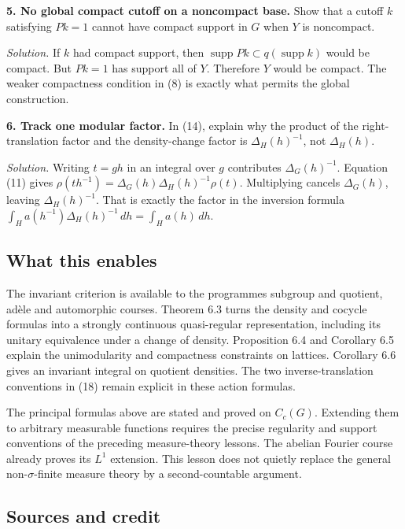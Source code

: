 \documentclass[
  english,
  11pt,
  a4paper,
]{article}
\begin{document}
\textbf{5. No global compact cutoff on a noncompact base.} Show that a
cutoff \(k\) satisfying \(Pk=1\) cannot have compact support in \(G\)
when \(Y\) is noncompact.

\emph{Solution.} If \(k\) had compact support, then
\(\operatorname{supp}Pk\subset q(\operatorname{supp}k)\) would be
compact. But \(Pk=1\) has support all of \(Y\). Therefore \(Y\) would be
compact. The weaker compactness condition in (8) is exactly what permits
the global construction.

\textbf{6. Track one modular factor.} In (14), explain why the product
of the right-translation factor and the density-change factor is
\(\Delta_H(h)^{-1}\), not \(\Delta_H(h)\).

\emph{Solution.} Writing \(t=gh\) in an integral over \(g\) contributes
\(\Delta_G(h)^{-1}\). Equation (11) gives
\(\rho(th^{-1})=\Delta_G(h)\Delta_H(h)^{-1}\rho(t)\). Multiplying
cancels \(\Delta_G(h)\), leaving \(\Delta_H(h)^{-1}\). That is exactly
the factor in the inversion formula
\(\int_H a(h^{-1})\Delta_H(h)^{-1}\,dh=\int_Ha(h)\,dh\).

\subsection{What this
enables}\label{quotient-measures-and-weils-integration-formula--what-this-enables}

The invariant criterion is available to the programme\textquotesingle s
subgroup and quotient, adèle and automorphic courses. Theorem 6.3 turns
the density and cocycle formulas into a strongly continuous
quasi-regular representation, including its unitary equivalence under a
change of density. Proposition 6.4 and Corollary 6.5 explain the
unimodularity and compactness constraints on lattices. Corollary 6.6
gives an invariant integral on quotient densities. The two
inverse-translation conventions in (18) remain explicit in these action
formulas.

The principal formulas above are stated and proved on \(C_c(G)\).
Extending them to arbitrary measurable functions requires the precise
regularity and support conventions of the preceding measure-theory
lessons. The abelian Fourier course already proves its \(L^1\)
extension. This lesson does not quietly replace the general
non-\(\sigma\)-finite measure theory by a second-countable argument.

\subsection{Sources and
credit}\label{quotient-measures-and-weils-integration-formula--sources-and-credit}
\end{document}
